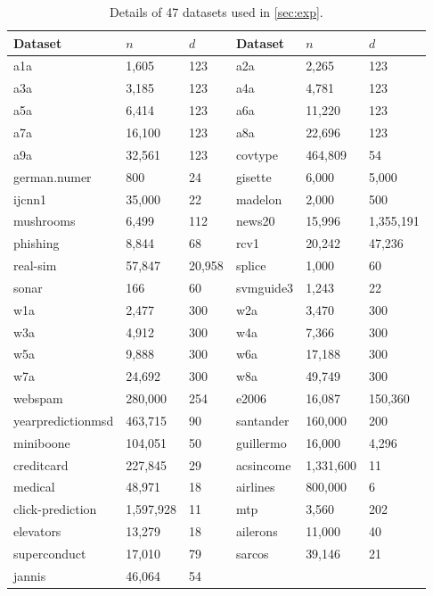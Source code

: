 \documentclass{article}
\theoremstyle{definition}
\begin{document}
\begin{table}[htbp]
  \centering
  \begin{tabularx}{\textwidth}{p{}YY|p{0.2\textwidth}YY}
    \toprule
    Dataset & $n$ & $d$ & Dataset & $n$ & $d$ \\
    \midrule
    a1a & 1,605 & 123 & a2a & 2,265 & 123 \\
    a3a & 3,185 & 123 & a4a & 4,781 & 123 \\
    a5a & 6,414 & 123 & a6a & 11,220 & 123 \\
    a7a & 16,100 & 123 & a8a & 22,696 & 123 \\
    a9a & 32,561 & 123 & covtype & 464,809 & 54 \\
    german.numer & 800 & 24 & gisette & 6,000 & 5,000 \\
    ijcnn1 & 35,000 & 22 & madelon & 2,000 & 500 \\
    mushrooms & 6,499 & 112 & news20 & 15,996 & 1,355,191 \\
    phishing & 8,844 & 68 & rcv1 & 20,242 & 47,236 \\
    real-sim & 57,847 & 20,958 & splice & 1,000 & 60 \\
    sonar & 166 & 60 & svmguide3 & 1,243 & 22 \\
    w1a & 2,477 & 300 & w2a & 3,470 & 300 \\
    w3a & 4,912 & 300 & w4a & 7,366 & 300 \\
    w5a & 9,888 & 300 & w6a & 17,188 & 300 \\
    w7a & 24,692 & 300 & w8a & 49,749 & 300 \\
    webspam & 280,000 & 254 & e2006 & 16,087 & 150,360 \\
    yearpredictionmsd & 463,715 & 90 & santander & 160,000 & 200 \\
    miniboone & 104,051 & 50 & guillermo & 16,000 & 4,296 \\
    creditcard & 227,845 & 29 & acsincome & 1,331,600 & 11 \\
    medical & 48,971 & 18 & airlines & 800,000 & 6 \\
    click-prediction & 1,597,928 & 11 & mtp & 3,560 & 202 \\
    elevators & 13,279 & 18 & ailerons & 11,000 & 40 \\
    superconduct & 17,010 & 79 & sarcos & 39,146 & 21 \\
    jannis & 46,064 & 54 &  &  &  \\
    \bottomrule
  \end{tabularx}
  \caption{Details of 47 datasets used in \cref{sec:exp}.}
  \label{tab:dataset}
\end{table}
\end{document}
